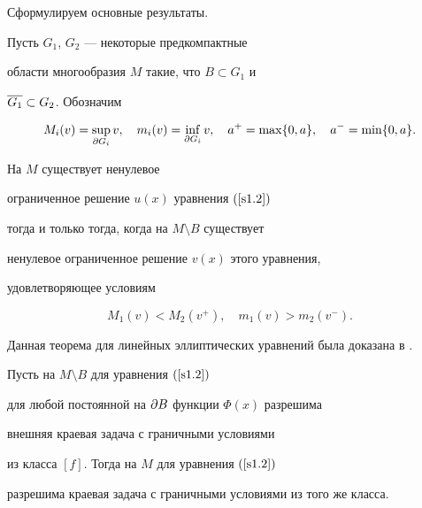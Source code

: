 Сформулируем основные результаты. 





Пусть $G_1$, $G_2$ ---  некоторые предкомпактные


области  многообразия $M$ такие, что $B\subset G_1$ и 


$\overline{G_1}\subset G_2$. Обозначим  


$$


M_i(v)=\sup_{\d G_i}v,\quad m_i(v)=\inf_{\d G_i}v,


\quad a^+=\max\{0,a\},\quad a^-=\min\{0,a\}.


$$








\begin{thms}\label{th1.1}


На $M$ существует ненулевое


ограниченное решение $u(x)$ уравнения $(\ref{s1.2})$


тогда и только тогда, когда на $M\setminus B$ существует


ненулевое ограниченное решение $v(x)$ этого уравнения,


удовлетворяющее условиям 


\begin{equation}


M_1(v)<M_2(v^+),\quad m_1(v)>m_2(v^-).


\label{s2.1}


\end{equation}


\end{thms}





Данная теорема для линейных эллиптических уравнений была доказана в \cite{G1}.








\begin{thms}\label{th1.2}


Пусть на $M\setminus B$ для уравнения $(\ref{s1.2})$


для любой постоянной на $\partial{B}$ функции $\Phi(x)$ разрешима


внешняя краевая задача с граничными условиями 


из класса $[f]$. Тогда на $M$ для уравнения $(\ref{s1.2})$ 


разрешима краевая задача с граничными условиями из того же класса. 


\end{thms}





